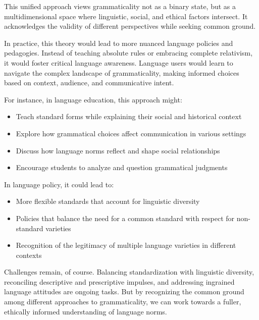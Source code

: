 This unified approach views grammaticality not as a binary state, but as a multidimensional space where linguistic, social, and ethical factors intersect. It acknowledges the validity of different perspectives while seeking common ground.

In practice, this theory would lead to more nuanced language policies and pedagogies. Instead of teaching absolute rules or embracing complete relativism, it would foster critical language awareness. Language users would learn to navigate the complex landscape of grammaticality, making informed choices based on context, audience, and communicative intent.

For instance, in language education, this approach might:

\begin{itemize}
    \item Teach standard forms while explaining their social and historical context
    \item Explore how grammatical choices affect communication in various settings
    \item Discuss how language norms reflect and shape social relationships
    \item Encourage students to analyze and question grammatical judgments
\end{itemize}

In language policy, it could lead to:

\begin{itemize}
    \item More flexible standards that account for linguistic diversity
    \item Policies that balance the need for a common standard with respect for non-standard varieties
    \item Recognition of the legitimacy of multiple language varieties in different contexts
\end{itemize}

Challenges remain, of course. Balancing standardization with linguistic diversity, reconciling descriptive and prescriptive impulses, and addressing ingrained language attitudes are ongoing tasks. But by recognizing the common ground among different approaches to grammaticality, we can work towards a fuller, ethically informed understanding of language norms.

